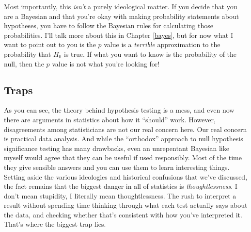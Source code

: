 \documentclass[
]{book}
\begin{document}
Most importantly, this \emph{isn't} a purely ideological matter. If you decide that you are a Bayesian and that you're okay with making probability statements about hypotheses, you have to follow the Bayesian rules for calculating those probabilities. I'll talk more about this in Chapter \ref{bayes}, but for now what I want to point out to you is the \(p\) value is a \emph{terrible} approximation to the probability that \(H_0\) is true. If what you want to know is the probability of the null, then the \(p\) value is not what you're looking for!

\hypertarget{traps}{%
\subsection{Traps}\label{traps}}

As you can see, the theory behind hypothesis testing is a mess, and even now there are arguments in statistics about how it ``should'' work. However, disagreements among statisticians are not our real concern here. Our real concern is practical data analysis. And while the ``orthodox'' approach to null hypothesis significance testing has many drawbacks, even an unrepentant Bayesian like myself would agree that they can be useful if used responsibly. Most of the time they give sensible answers and you can use them to learn interesting things. Setting aside the various ideologies and historical confusions that we've discussed, the fact remains that the biggest danger in all of statistics is \emph{thoughtlessness}. I don't mean stupidity, I literally mean thoughtlessness. The rush to interpret a result without spending time thinking through what each test actually says about the data, and checking whether that's consistent with how you've interpreted it. That's where the biggest trap lies.
\end{document}

